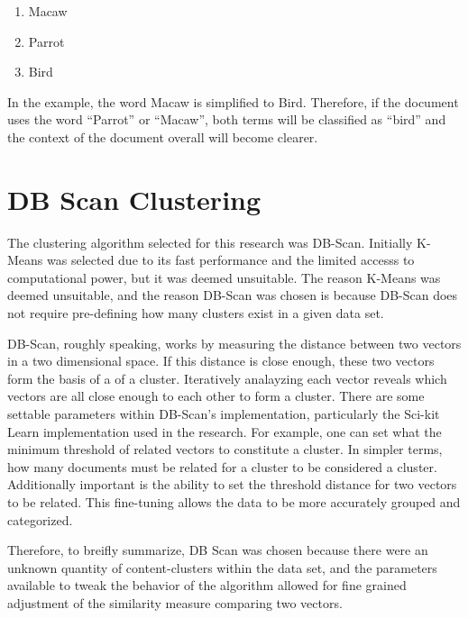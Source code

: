 \begin{enumerate}
\item Macaw
\item Parrot
\item Bird
\end{enumerate}

In the example, the word Macaw is simplified to Bird. Therefore, if
the document uses the word ``Parrot'' or ``Macaw'', both terms will be
classified as ``bird'' and the context of the document overall will
become clearer.

\section{DB Scan Clustering}
The clustering algorithm selected for this research was
DB-Scan. Initially K-Means was selected due to its fast performance
and the limited accesss to computational power, but it was deemed
unsuitable. The reason K-Means was deemed unsuitable, and the reason
DB-Scan was chosen is because DB-Scan does not require pre-defining
how many clusters exist in a given data set.

DB-Scan, roughly speaking, works by measuring the distance between two
vectors in a two dimensional space. If this distance is close enough,
these two vectors form the basis of a of a cluster. Iteratively
analayzing each vector reveals which vectors are all close enough to
each other to form a cluster. There are some settable parameters
within DB-Scan's implementation, particularly the Sci-kit Learn
implementation used in the research. For example, one can set what the
minimum threshold of related vectors to constitute a cluster. In
simpler terms, how many documents must be related for a cluster to be
considered a cluster. Additionally important is the ability to set the
threshold distance for two vectors to be related. This fine-tuning
allows the data to be more accurately grouped and categorized.

Therefore, to breifly summarize, DB Scan was chosen because there were
an unknown quantity of content-clusters within the data set, and the
parameters available to tweak the behavior of the algorithm allowed
for fine grained adjustment of the similarity measure comparing two
vectors.
